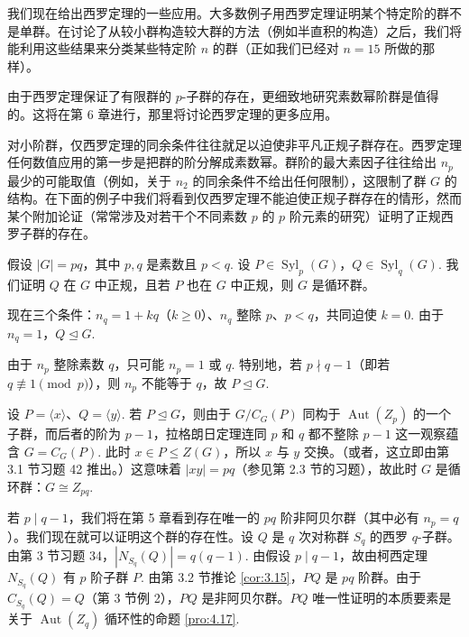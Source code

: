 我们现在给出西罗定理的一些应用。大多数例子用西罗定理证明某个特定阶的群不是单群。在讨论了从较小群构造较大群的方法（例如半直积的构造）之后，我们将能利用这些结果来分类某些特定阶 \(n\) 的群（正如我们已经对 \(n = 15\) 所做的那样）。

由于西罗定理保证了有限群的 \(p\)-子群的存在，更细致地研究素数幂阶群是值得的。这将在第 6 章进行，那里将讨论西罗定理的更多应用。

对小阶群，仅西罗定理的同余条件往往就足以迫使非平凡正规子群存在。西罗定理任何数值应用的第一步是把群的阶分解成素数幂。群阶的最大素因子往往给出 \(n_p\) 最少的可能取值（例如，关于 \(n_2\) 的同余条件不给出任何限制），这限制了群 \(G\) 的结构。在下面的例子中我们将看到仅西罗定理不能迫使正规子群存在的情形，然而某个附加论证（常常涉及对若干个不同素数 \(p\) 的 \(p\) 阶元素的研究）证明了正规西罗子群的存在。

\begin{example}[\(pq\) 阶群，\(p, q\) 是素数且 \(p < q\)]
假设 \(|G| = pq\)，其中 \(p, q\) 是素数且 \(p < q\). 设 \(P \in \operatorname{Syl}_p(G)\)，\(Q \in \operatorname{Syl}_q(G)\). 我们证明 \(Q\) 在 \(G\) 中正规，且若 \(P\) 也在 \(G\) 中正规，则 \(G\) 是循环群。

现在三个条件：\(n_q = 1 + kq\)（\(k \geq 0\)）、\(n_q\) 整除 \(p\)、\(p < q\)，共同迫使 \(k = 0\). 由于 \(n_q = 1\)，\(Q \trianglelefteq G\).

由于 \(n_p\) 整除素数 \(q\)，只可能 \(n_p = 1\) 或 \(q\). 特别地，若 \(p \nmid q - 1\)（即若 \(q \not\equiv 1 \pmod{p}\)），则 \(n_p\) 不能等于 \(q\)，故 \(P \trianglelefteq G\).

设 \(P = \langle x \rangle\)、\(Q = \langle y \rangle\). 若 \(P \trianglelefteq G\)，则由于 \(G/C_G(P)\) 同构于 \(\operatorname{Aut}(Z_p)\) 的一个子群，而后者的阶为 \(p - 1\)，拉格朗日定理连同 \(p\) 和 \(q\) 都不整除 \(p - 1\) 这一观察蕴含 \(G = C_G(P)\). 此时 \(x \in P \leq Z(G)\)，所以 \(x\) 与 \(y\) 交换。（或者，这立即由第 3.1 节习题 42 推出。）这意味着 \(|xy| = pq\)（参见第 2.3 节的习题），故此时 \(G\) 是循环群：\(G \cong Z_{pq}\).

若 \(p \mid q - 1\)，我们将在第 5 章看到存在唯一的 \(pq\) 阶非阿贝尔群（其中必有 \(n_p = q\)）。我们现在就可以证明这个群的存在性。设 \(Q\) 是 \(q\) 次对称群 \(S_q\) 的西罗 \(q\)-子群。由第 3 节习题 34，\(|N_{S_q}(Q)| = q(q-1)\). 由假设 \(p \mid q-1\)，故由柯西定理 \(N_{S_q}(Q)\) 有 \(p\) 阶子群 \(P\). 由第 3.2 节推论 \ref{cor:3.15}，\(PQ\) 是 \(pq\) 阶群。由于 \(C_{S_q}(Q) = Q\)（第 3 节例 2），\(PQ\) 是非阿贝尔群。\(PQ\) 唯一性证明的本质要素是关于 \(\operatorname{Aut}(Z_q)\) 循环性的命题 \ref{pro:4.17}.
\end{example}

